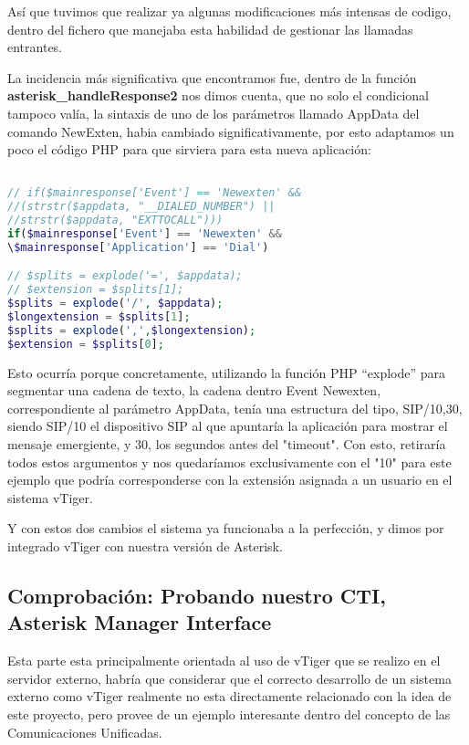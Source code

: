 Así que tuvimos que realizar ya algunas modificaciones más intensas de codigo, dentro del fichero que manejaba esta habilidad de gestionar las llamadas entrantes.

La incidencia más significativa que encontramos fue, dentro de la función \textbf{asterisk\_handleResponse2} nos dimos cuenta, que no solo el condicional tampoco valía, la sintaxis de uno de los parámetros llamado AppData del comando NewExten, habia cambiado significativamente, por esto adaptamos un poco el código PHP para que sirviera para esta nueva aplicación:

\begin{lstlisting}[language=php,title={./www/vtigercrm/cron/modules/PBXManager/AsteriskClient.php}]

// if($mainresponse['Event'] == 'Newexten' && 
//(strstr($appdata, "__DIALED_NUMBER") || 
//strstr($appdata, "EXTTOCALL")))
if($mainresponse['Event'] == 'Newexten' && 
\$mainresponse['Application'] == 'Dial')

// $splits = explode('=', $appdata);
// $extension = $splits[1];
$splits = explode('/', $appdata); 
$longextension = $splits[1];
$splits = explode(',',$longextension);
$extension = $splits[0];

\end{lstlisting}

Esto ocurría porque concretamente, utilizando la función PHP ``explode'' para segmentar una cadena de texto, la cadena dentro Event Newexten, correspondiente al parámetro AppData, tenía una estructura del tipo, SIP/10,30, siendo SIP/10 el dispositivo SIP al que apuntaría la aplicación para mostrar el mensaje emergiente, y 30, los segundos antes del "timeout". Con esto, retiraría todos estos argumentos y nos quedaríamos exclusivamente con el "10" para este ejemplo que podría corresponderse con la extensión asignada a un usuario en el sistema vTiger.

Y con estos dos cambios el sistema ya funcionaba a la perfección, y dimos por integrado vTiger con nuestra versión de Asterisk.

\subsection{Comprobación: Probando nuestro CTI, Asterisk Manager Interface}

Esta parte esta principalmente orientada al uso de vTiger que se realizo en el servidor externo, habría que considerar que el correcto desarrollo de un sistema externo como vTiger realmente no esta directamente relacionado con la idea de este proyecto, pero provee de un ejemplo interesante dentro del concepto de las Comunicaciones Unificadas. 

